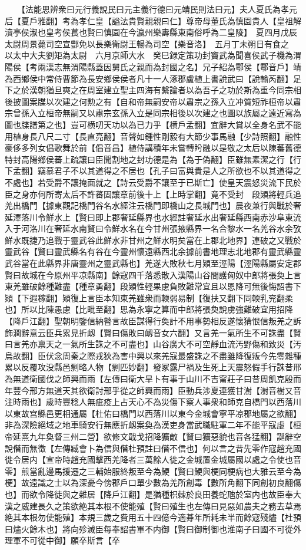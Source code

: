 　　【法能思辨衆曰元行義說民曰元主義行德曰元靖民則法曰元】夫人夏氏為孝元后【夏戶雅翻】考為孝仁皇【謚法貴賢親親曰仁】尊帝母董氏為慎園貴人【皇祖解瀆亭侯淑也皇考侯萇也賢曰慎園在今瀛州樂夀縣東南俗呼為二皇陵】　夏四月戊辰太尉周景薨司空宣酆免以長樂衛尉王暢為司空【樂音洛】　五月丁未朔日有食之　以太中大夫劉矩為太尉　六月京師大水　癸巳録定策功封竇武為聞喜侯武子機為渭陽侯【考兩漢志無渭陽縣蓋因舅氏之親而為封國之名】兄子紹為鄠侯【鄠音戶】靖為西鄉侯中常侍曹節為長安鄉侯侯者凡十一人涿郡盧植上書說武曰【說輸芮翻】足下之於漢朝猶旦奭之在周室建立聖主四海有繫論者以為吾子之功於斯為重今同宗相後披圖案牒以次建之何勲之有【自和帝無嗣安帝以肅宗之孫入立冲質短祚桓帝以肅宗曾孫入立桓帝無嗣又以肅宗玄孫入立是同宗相後以次建之也圖以族屬之遠近寫為圖也牒譜第之也】豈可横叨天功以為已力乎【横戶孟翻】宜辭大賞以全身名武不能用植身長八尺二寸【長直亮翻】音聲如鍾性剛毅有大節少事馬融【少詩照翻】融性豪侈多列女倡歌舞於前【倡音昌】植侍講積年未嘗轉盻融以是敬之太后以陳蕃舊德特封高陽鄉侯蕃上疏讓曰臣聞割地之封功德是為【為于偽翻】臣雖無素潔之行【行下孟翻】竊慕君子不以其道得之不居也【孔子曰富與貴是人之所欲也不以其道得之不處也】若受爵不讓掩面就之【詩云受爵不讓至于已斯亡】使皇天震怒災流下民於臣之身亦何所寄太后不許蕃固讓章前後十上【上時掌翻】竟不受封　段熲將輕兵追羌出橋門【據東觀記橋門谷名水經注云橋門即橋山之長城門也】晨夜兼行與戰於奢延澤落川令鮮水上【賢曰即上郡奢延縣界也水經註奢延水出奢延縣西南赤沙阜東流入于河洛川在奢延水南賢曰令鮮水名在今甘州張掖縣界一名合黎水一名羌谷水余攷鮮水既捷乃追戰于靈武谷此鮮水非甘州之鮮水明矣當在上郡北地界】連破之又戰於靈武谷【賢曰靈武縣名有谷在今靈州懷遠縣西北余據前書地理志北地郡有靈武縣靈武谷當在此縣界非唐靈州之靈武縣也】羌遂大敗秋七月熲至涇陽【涇陽縣屬安定郡賢曰故城在今原州平凉縣南】餘寇四千落悉散入漢陽山谷間護匈奴中郎將張奐上言東羌雖破餘種難盡【種章勇翻】段熲性輕果慮負敗難常宜且以恩降可無後悔詔書下熲【下遐稼翻】熲復上言臣本知東羌雖衆而輭弱易制【復扶又翻下同輭乳兖翻柔也】所以比陳愚慮【比毗至翻】思為永寧之算而中郎將張奐說虜強難破宜用招降【降戶江翻】聖朝明鑒信納瞽言故臣謀得行奐計不用事勢相反遂懷猜恨信叛羌之訴飾潤辭意云臣兵累見折衂【賢曰傷敗曰衂音女六翻】又言羌一氣所生不可誅盡【賢曰言羌亦禀天之一氣所生誅之不可盡也】山谷廣大不可空靜血流汚野傷和致災【汚烏故翻】臣伏念周秦之際戎狄為害中興以來羌寇最盛誅之不盡雖降復叛今先零雜種累以反覆攻没縣邑剽略人物【剽匹妙翻】發冢露尸禍及生死上天震怒假手行誅昔邢為無道衛國伐之師興而雨【左傳曰衛大旱卜有事于山川不吉甯莊子曰昔周飢克殷而年豐今邢方無道天其欲衛討邢乎從之師興而雨】臣動兵涉夏連獲甘澍【澍音樹又音注時雨也】歲時豐稔人無疵疫上占天心不為災傷下察人事衆和師克自橋門以西落川以東故宫縣邑更相通屬【杜佑曰橋門以西落川以東今金城會寧平凉郡地屬之欲翻】非為深險絕域之地車騎安行無應折衂案奐為漢吏身當武職駐軍二年不能平寇虛【桓帝延熹九年奐督三州二營】欲修文戢戈招降獷敵【賢曰獷惡貌也音各猛翻】誕辭空說僭而無徵【左傳臧會卜為信與僭杜預註曰僭不信也】何以言之昔先零作寇趙充國徙令居内【宣帝時趙充國擊西羌降者三萬餘人徙之金城置金城屬國以處之令使也音零】煎當亂邊馬援遷之三輔始服終叛至今為鯁【賢曰鯁與梗同梗病也大雅云至今為梗】故遠識之士以為深憂今傍郡戶口單少數為羌所創毒【數所角翻下同創初良翻傷也】而欲令降徒與之雜居【降戶江翻】是猶種枳棘於良田養蛇虺於室内也故臣奉大漢之威建長久之策欲絶其本根不使能殖【賢曰殖生也左傳曰見惡如農夫之務去草焉絶其本根勿使能殖】本規三歲之費用五十四億今適朞年所耗未半而餘寇殘燼【杜預曰燼火餘木也】將向殄滅臣每奉詔書軍不内御【賢曰御制御也淮南子曰國不可從外理軍不可從中御】願卒斯言【卒